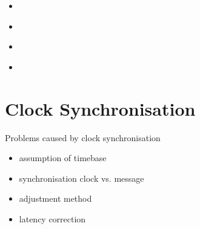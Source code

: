 \documentclass{beamer}
\begin{document}
\begin{frame}{}%
\begin{center}
\begin{itemize}
  \item \begin{large}\end{large}
 \item \begin{large}\end{large}
 \item \begin{large}\end{large}
 \item \begin{large}\end{large}
\end{itemize}
\end{center}
\end{frame}


\section{Clock Synchronisation}
\begin{frame}{Problems caused by clock synchronisation}%
\begin{center}
\begin{itemize}
  \item \begin{large}assumption of timebase\end{large}
 \item \begin{large}synchronisation clock vs. message\end{large}
 \item \begin{large}adjustment method\end{large}
 \item \begin{large}latency correction\end{large}
\end{itemize}
\end{center}
\end{frame}
\end{document}
